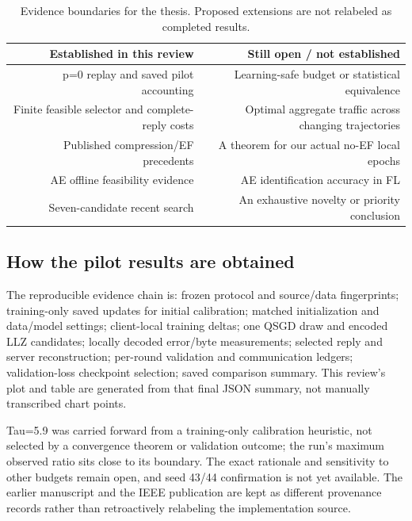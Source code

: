 \documentclass[11pt,a4paper]{article}
\begin{document}
\begin{table}[htbp]
\centering
\small
\begin{tabularx}{\textwidth}{R{0.98000}R{1.02000}}
\toprule
\textbf{Established in this review} & \textbf{Still open / not established} \\\midrule
p=0 replay and saved pilot accounting & Learning-safe budget or statistical equivalence \\
Finite feasible selector and complete-reply costs & Optimal aggregate traffic across changing trajectories \\
Published compression/EF precedents & A theorem for our actual no-EF local epochs \\
AE offline feasibility evidence & AE identification accuracy in FL \\
Seven-candidate recent search & An exhaustive novelty or priority conclusion \\
\bottomrule
\end{tabularx}
\caption{Evidence boundaries for the thesis. Proposed extensions are not relabeled as completed results.}
\label{tab:evidence}
\end{table}

\subsection*{How the pilot results are obtained}

The reproducible evidence chain is: frozen protocol and source/data fingerprints; training-only saved updates for initial calibration; matched initialization and data/model settings; client-local training deltas; one QSGD draw and encoded LLZ candidates; locally decoded error/byte measurements; selected reply and server reconstruction; per-round validation and communication ledgers; validation-loss checkpoint selection; saved comparison summary. This review's plot and table are generated from that final JSON summary, not manually transcribed chart points.

Tau=5.9 was carried forward from a training-only calibration heuristic, not selected by a convergence theorem or validation outcome; the run's maximum observed ratio sits close to its boundary. The exact rationale and sensitivity to other budgets remain open, and seed 43/44 confirmation is not yet available. The earlier manuscript and the IEEE publication are kept as different provenance records rather than retroactively relabeling the implementation source. \parencite{cao2026llzmanuscript,cao2026llz}
\end{document}
